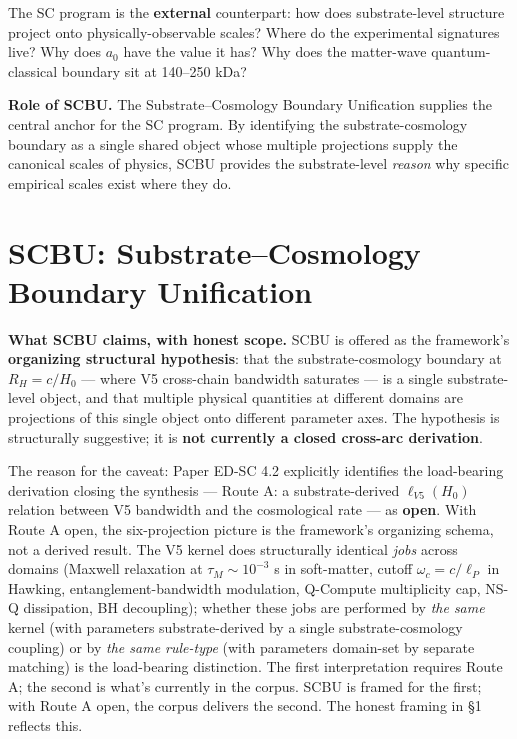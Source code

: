 \documentclass[11pt,a4paper]{article}
\begin{document}
The SC program is the \textbf{external} counterpart: how does substrate-level structure project onto physically-observable scales? Where do the experimental signatures live? Why does $a_0$ have the value it has? Why does the matter-wave quantum-classical boundary sit at 140--250 kDa?

\textbf{Role of SCBU.} The Substrate--Cosmology Boundary Unification supplies the central anchor for the SC program. By identifying the substrate-cosmology boundary as a single shared object whose multiple projections supply the canonical scales of physics, SCBU provides the substrate-level \emph{reason} why specific empirical scales exist where they do.

\section{SCBU: Substrate--Cosmology Boundary Unification}

\textbf{What SCBU claims, with honest scope.} SCBU is offered as the framework's \textbf{organizing structural hypothesis}: that the substrate-cosmology boundary at $R_H = c / H_0$ --- where V5 cross-chain bandwidth saturates --- is a single substrate-level object, and that multiple physical quantities at different domains are projections of this single object onto different parameter axes. The hypothesis is structurally suggestive; it is \textbf{not currently a closed cross-arc derivation}.

The reason for the caveat: Paper ED-SC 4.2 explicitly identifies the load-bearing derivation closing the synthesis --- Route A: a substrate-derived $\ell_{V5}(H_0)$ relation between V5 bandwidth and the cosmological rate --- as \textbf{open}. With Route A open, the six-projection picture is the framework's organizing schema, not a derived result. The V5 kernel does structurally identical \emph{jobs} across domains (Maxwell relaxation at $\tau_M \sim 10^{-3}$ s in soft-matter, cutoff $\omega_c = c/\ell_P$ in Hawking, entanglement-bandwidth modulation, Q-Compute multiplicity cap, NS-Q dissipation, BH decoupling); whether these jobs are performed by \emph{the same} kernel (with parameters substrate-derived by a single substrate-cosmology coupling) or by \emph{the same rule-type} (with parameters domain-set by separate matching) is the load-bearing distinction. The first interpretation requires Route A; the second is what's currently in the corpus. SCBU is framed for the first; with Route A open, the corpus delivers the second. The honest framing in \S1 reflects this.
\end{document}
